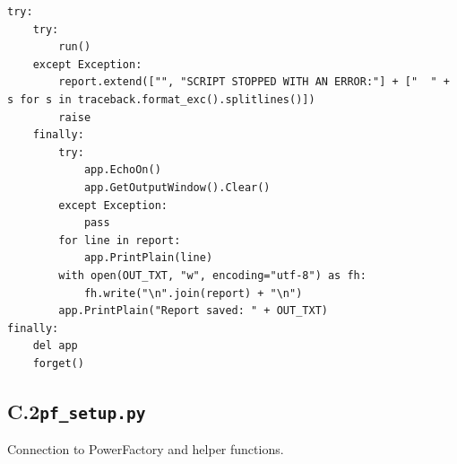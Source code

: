 \documentclass[12pt,a4paper]{article}
\begin{document}
\begin{lstlisting}
try:
    try:
        run()
    except Exception:
        report.extend(["", "SCRIPT STOPPED WITH AN ERROR:"] + ["  " + s for s in traceback.format_exc().splitlines()])
        raise
    finally:
        try:
            app.EchoOn()
            app.GetOutputWindow().Clear()
        except Exception:
            pass
        for line in report:
            app.PrintPlain(line)
        with open(OUT_TXT, "w", encoding="utf-8") as fh:
            fh.write("\n".join(report) + "\n")
        app.PrintPlain("Report saved: " + OUT_TXT)
finally:
    del app
    forget()
\end{lstlisting}

\subsection*{C.2\quad \texttt{pf\_setup.py}}
Connection to PowerFactory and helper functions.
\end{document}
